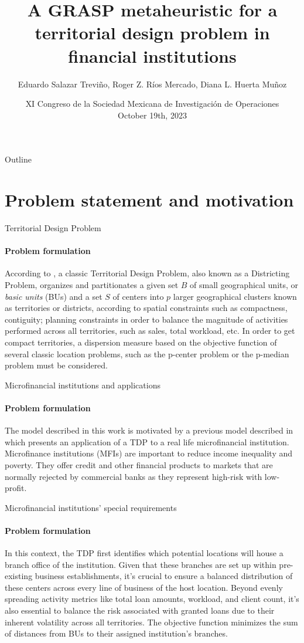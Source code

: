 \documentclass{beamer}
\title[A GRASP metaheuristic for a TDP]
{A GRASP metaheuristic for a territorial design problem in financial institutions}
\author{Eduardo Salazar Treviño, Roger Z. Ríos Mercado, Diana L. Huerta Muñoz}
\institute[]{
    Department of Mechanical and Electrical Engineering \\
    Universidad Autónoma de Nuevo León \\
    San Nicolás de los Garza, N.L.
}
\date[X CSMIO]{
    XI Congreso de la Sociedad Mexicana de Investigación de Operaciones \\ 
    October 19th, 2023
}
\begin{document}
\begin{frame}
    \titlepage
\end{frame}

\begin{frame}{Outline}
    \tableofcontents
\end{frame}

\section{Problem statement and motivation}

\begin{frame}{Territorial Design Problem}
    \framesubtitle{Problem formulation}
    According to \cite{cor2009}, a classic Territorial Design Problem, also known as a Districting Problem, organizes and partitionates a given set $B$ of small geographical units, or \textit{basic units} (BUs) and a set $S$ of centers into $p$ larger geographical clusters known as territories or districts, according to spatial constraints such as compactness, contiguity; planning constraints in order to balance the magnitude of activities performed across all territories, such as sales, total workload, etc. In order to get compact territories, a dispersion measure  based on the objective function of several classic location problems, such as the p-center problem or the p-median problem must be considered.
\end{frame}

\begin{frame}{Microfinancial institutions and applications}
    \framesubtitle{Problem formulation}
    The model described in this work is motivated by a previous model described in \cite{jimo2020} which presents an application of a TDP to a real life microfinancial institution. Microfinance institutions (MFIs) are important to reduce income inequality and poverty. They offer credit and other financial products to markets that are normally rejected by commercial banks as they represent high-risk with low-profit.
\end{frame}

\begin{frame}{Microfinancial institutions' special requirements}
    \framesubtitle{Problem formulation}
    In this context, the TDP first identifies which potential locations will house a branch office of the institution. Given that these branches are set up within pre-existing business establishments, it's crucial to ensure a balanced distribution of these centers across every line of business of the host location. Beyond evenly spreading activity metrics like total loan amounts, workload, and client count, it's also essential to balance the risk associated with granted loans due to their inherent volatility across all territories. The objective function minimizes the sum of distances from BUs to their assigned institution's branches.
\end{frame}
\end{document}
